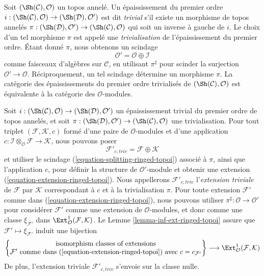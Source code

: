\begin{remark}
\label{remark-trivial-thickening-ringed-topoi}
Soit $(\Sh(\mathcal{C}), \mathcal{O})$ un topos annelé. Un épaississement du
premier ordre $i : (\Sh(\mathcal{C}), \mathcal{O}) \to
(\Sh(\mathcal{D}), \mathcal{O}')$ est dit {\it trivial} s'il existe un
morphisme de topos annelés
$\pi : (\Sh(\mathcal{D}), \mathcal{O}') \to (\Sh(\mathcal{C}), \mathcal{O})$
qui soit un inverse à gauche de $i$. Le choix d'un tel morphisme $\pi$ est
appelé une {\it trivialisation} de l'épaississement du premier ordre.
Étant donné $\pi$, nous obtenons un scindage
\begin{equation}
\label{equation-splitting-ringed-topoi}
\mathcal{O}' = \mathcal{O} \oplus \mathcal{I}
\end{equation}
comme faisceaux d'algèbres sur $\mathcal{C}$, en utilisant $\pi^\sharp$ pour
scinder la surjection $\mathcal{O}' \to \mathcal{O}$.
Réciproquement, un tel scindage détermine un morphisme $\pi$. La catégorie des
épaississements du premier ordre trivialisés de
$(\Sh(\mathcal{C}), \mathcal{O})$ est équivalente à la catégorie des
$\mathcal{O}$-modules.
\end{remark}

\begin{remark}
\label{remark-trivial-extension-ringed-topoi}
Soit $i : (\Sh(\mathcal{C}), \mathcal{O}) \to (\Sh(\mathcal{D}), \mathcal{O}')$
un épaississement trivial du premier ordre de topos annelés, et soit
$\pi : (\Sh(\mathcal{D}), \mathcal{O}') \to
(\Sh(\mathcal{C}), \mathcal{O})$ une trivialisation. Pour tout triplet
$(\mathcal{F}, \mathcal{K}, c)$ formé d'une paire de $\mathcal{O}$-modules et
d'une application
$c : \mathcal{I} \otimes_\mathcal{O} \mathcal{F} \to \mathcal{K}$,
nous pouvons poser
$$
\mathcal{F}'_{c, triv} = \mathcal{F} \oplus \mathcal{K}
$$
et utiliser le scindage (\ref{equation-splitting-ringed-topoi}) associé à
$\pi$, ainsi que l'application $c$, pour définir la structure de
$\mathcal{O}'$-module et obtenir une extension
(\ref{equation-extension-ringed-topoi}).
Nous appellerons $\mathcal{F}'_{c, triv}$ l'{\it extension triviale} de
$\mathcal{F}$ par $\mathcal{K}$ correspondant à $c$ et à la trivialisation
$\pi$. Pour toute extension $\mathcal{F}'$ comme dans
(\ref{equation-extension-ringed-topoi}), nous pouvons utiliser
$\pi^\sharp : \mathcal{O} \to \mathcal{O}'$ pour considérer $\mathcal{F}'$
comme une extension de $\mathcal{O}$-modules, et donc comme une classe
$\xi_{\mathcal{F}'}$ dans
$\Ext^1_\mathcal{O}(\mathcal{F}, \mathcal{K})$.
Le Lemme \ref{lemma-inf-ext-ringed-topoi} assure que
$\mathcal{F}' \mapsto \xi_{\mathcal{F}'}$ induit une bijection
$$
\left\{
\begin{matrix}
\text{isomorphism classes of extensions}\\
\mathcal{F}'\text{ comme dans (\ref{equation-extension-ringed-topoi}) avec }
c = c_{\mathcal{F}'}
\end{matrix}
\right\}
\longrightarrow
\Ext^1_\mathcal{O}(\mathcal{F}, \mathcal{K})
$$
De plus, l'extension triviale $\mathcal{F}'_{c, triv}$ s'envoie sur la classe
nulle.
\end{remark}

